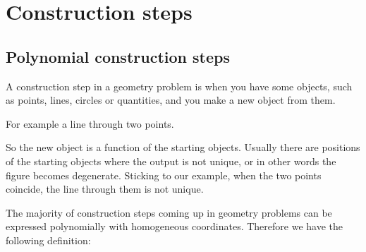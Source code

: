 \documentclass[a4paper]{article}
\newcommand{\ord}{\operatorname{ord}}
\begin{document}






\section{Construction steps}

\subsection{Polynomial construction steps}
A construction step in a geometry problem is when you have some objects, such as points, lines, circles or quantities, and you make a new object from them.

For example a line through two points.

So the new object is a function of the starting objects. Usually there are positions of the starting objects where the output is not unique, or in other words the figure becomes degenerate. Sticking to our example, when the two points coincide, the line through them is not unique.

The majority of construction steps coming up in geometry problems can be expressed polynomially with homogeneous coordinates. Therefore we have the following definition:
\end{document}
